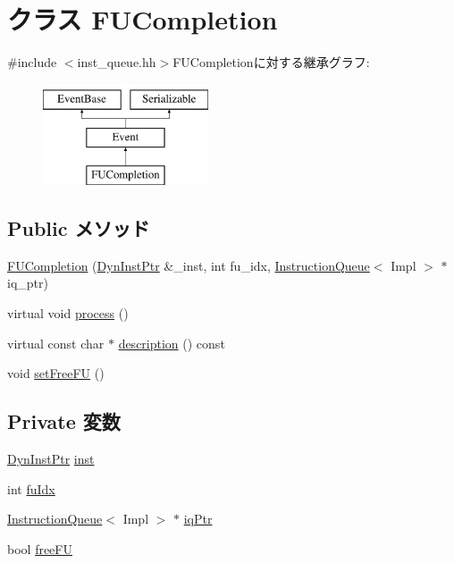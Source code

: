\hypertarget{classInstructionQueue_1_1FUCompletion}{
\section{クラス FUCompletion}
\label{classInstructionQueue_1_1FUCompletion}
}


{\ttfamily \#include $<$inst\_\-queue.hh$>$}FUCompletionに対する継承グラフ:\begin{figure}[H]
\begin{center}
\leavevmode
\includegraphics[height=3cm]{classInstructionQueue_1_1FUCompletion}
\end{center}
\end{figure}
\subsection*{Public メソッド}
\begin{DoxyCompactItemize}
\item 
\hyperlink{classInstructionQueue_1_1FUCompletion_a61244ecdd6a72de08a00a1e3435c0d98}{FUCompletion} (\hyperlink{classInstructionQueue_a028ce10889c5f6450239d9e9a7347976}{DynInstPtr} \&\_\-inst, int fu\_\-idx, \hyperlink{classInstructionQueue}{InstructionQueue}$<$ Impl $>$ $\ast$iq\_\-ptr)
\item 
virtual void \hyperlink{classInstructionQueue_1_1FUCompletion_a2e9c5136d19b1a95fc427e0852deab5c}{process} ()
\item 
virtual const char $\ast$ \hyperlink{classInstructionQueue_1_1FUCompletion_a5a14fe478e2393ff51f02e9b7be27e00}{description} () const 
\item 
void \hyperlink{classInstructionQueue_1_1FUCompletion_ae7af3c3f2fa23850b94771ec2838c3fc}{setFreeFU} ()
\end{DoxyCompactItemize}
\subsection*{Private 変数}
\begin{DoxyCompactItemize}
\item 
\hyperlink{classInstructionQueue_a028ce10889c5f6450239d9e9a7347976}{DynInstPtr} \hyperlink{classInstructionQueue_1_1FUCompletion_af5d4fb974eeb4507d4c837d365d0cefc}{inst}
\item 
int \hyperlink{classInstructionQueue_1_1FUCompletion_ae76a7e2adfb158874f48a23c71690db3}{fuIdx}
\item 
\hyperlink{classInstructionQueue}{InstructionQueue}$<$ Impl $>$ $\ast$ \hyperlink{classInstructionQueue_1_1FUCompletion_ae1fd26993119273f381c42894e2672c6}{iqPtr}
\item 
bool \hyperlink{classInstructionQueue_1_1FUCompletion_a535ed82ab8098d4da414bfa62e95867d}{freeFU}
\end{DoxyCompactItemize}



